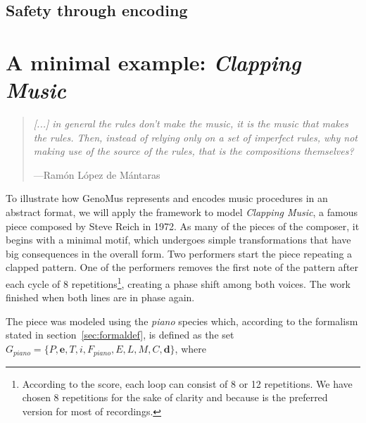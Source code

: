 \documentclass{article}
\renewcommand{\vec}[1]{\mathbf{#1}}
\begin{document}
\subsection{Safety through encoding}








\section{A minimal example: \textsl{Clapping Music}}

\begin{samepage}
\begin{quotation}
\textsl{[...] in general the rules don't make the music, it is the music that makes the rules. Then, instead of relying only on a set of imperfect rules, why not making use of the source of the rules, that is the compositions themselves?
}

---Ram\'{o}n L\'{o}pez de M\'{a}ntaras \cite{LopezdeMantaras:2006:MMA:1565082.1565089}
\end{quotation}
\end{samepage}






To illustrate how GenoMus represents and encodes music procedures in an abstract format, we will apply the framework to model \emph{Clapping Music}, a famous piece composed by Steve Reich in 1972. As many of the pieces of the composer, it begins with a minimal motif, which undergoes simple transformations that have big consequences in the overall form. Two performers start the piece repeating a clapped pattern. One of the performers removes the first note of the pattern after each cycle of 8 repetitions\footnote{According to the score, each loop can consist of 8 or 12 repetitions. We have chosen 8 repetitions for the sake of clarity and because is the preferred version for most of recordings.}, creating a phase shift among both voices. The work finished when both lines are in phase again.

The piece was modeled using the \emph{piano} species which, according to the formalism stated in section~\ref{sec:formaldef}, is defined as the set $G_{piano} = \{P, \vec{e}, T, i, F_{piano}, E, L, M, C, \vec{d}\}$, where
\end{document}
